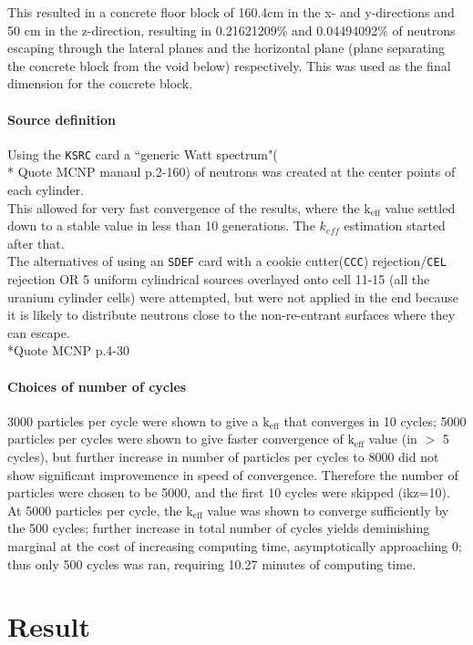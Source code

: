 \documentclass[a4paper, 12pt]{article}
\begin{document}
This resulted in a concrete floor block of 160.4cm in the x- and y-directions and 50 cm in the z-direction, resulting in 0.21621209\%  and 0.04494092\% of neutrons escaping through the lateral planes and the horizontal plane (plane separating the concrete block from the void below) respectively. This was used as the final dimension for the concrete block.

\paragraph{Source definition}
Using the \texttt{KSRC} card a ``generic Watt spectrum"(\\* Quote MCNP manaul p.2-160) of neutrons was created at the center points of each cylinder.
\\This allowed for very fast convergence of the results, where the $\text{k}_{\text{eff}}$ value settled down to a stable value in less than 10 generations. The $k_{eff}$ estimation started after that.
\\The alternatives of using an \texttt{SDEF} card with a cookie cutter(\texttt{CCC}) rejection/\texttt{CEL} rejection OR 5 uniform cylindrical sources overlayed onto cell 11-15 (all the uranium cylinder cells) were attempted, but were not applied in the end because it is likely to distribute neutrons close to the non-re-entrant surfaces where they can escape. \\*Quote MCNP p.4-30

\paragraph{Choices of number of cycles}
3000 particles per cycle were shown to give a $\text{k}_{\text{eff}}$ that converges in 10 cycles; 5000 particles per cycles were shown to give faster convergence of $\text{k}_{\text{eff}}$ value (in $>$ 5 cycles), but further increase in number of particles per cycles to 8000 did not show significant improvemence in speed of convergence. Therefore the number of particles were chosen to be 5000, and the first 10 cycles were skipped (ikz=10).
At 5000 particles per cycle, the $\text{k}_{\text{eff}}$ value was shown to converge sufficiently by the 500 cycles; further increase in total number of cycles yields deminishing marginal at the cost of increasing computing time, asymptotically approaching 0; thus only 500 cycles was ran, requiring 10.27 minutes of computing time.

\section{Result}
\end{document}
